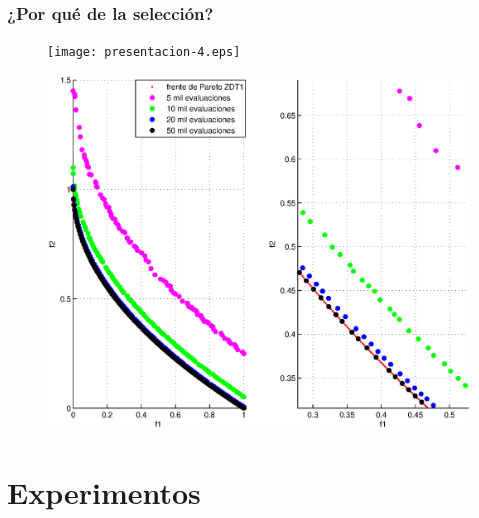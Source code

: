 \documentclass[10pt,compress]{beamer}
\begin{document}
\begin{frame}
\frametitle{¿Por qu\'e de la selecci\'on?}
\begin{figure}[H]
	\centering
	\texttt{[image: presentacion-4.eps]}      
      \end{figure}
\end{frame}
\begin{frame}
	
	\begin{figure}[H]
	\centering
	\includegraphics[scale=0.45]{zdt1varios.eps}      
      \end{figure}
\end{frame}


\section{Experimentos}
\frame{\tableofcontents[currentsection]}
\end{document}
